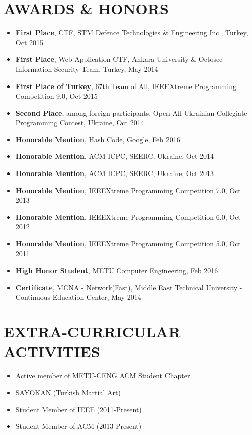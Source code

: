\documentclass[margin, 10pt]{res} %
\begin{document}
\begin{resume}
\newpage










\section{AWARDS \& HONORS}
\begin{itemize} \itemsep -2pt %
\item {\bf First Place}, CTF, STM Defence Technologies \& Engineering Inc., Turkey, Oct 2015
\item {\bf First Place}, Web Application CTF, Ankara University \& Octosec Information Security Team, Turkey, May 2014
\item {\bf First Place of Turkey}, 67th Team of All, IEEEXtreme Programming Competition 9.0, Oct 2015
\item {\bf Second Place}, among foreign participants, Open All-Ukrainian Collegiate Programming Contest, Ukraine, Oct 2014
\item {\bf Honorable Mention}, Hash Code, Google, Feb 2016
\item {\bf Honorable Mention}, ACM ICPC, SEERC, Ukraine, Oct 2014
\item {\bf Honorable Mention}, ACM ICPC, SEERC, Ukraine, Oct 2013
\item {\bf Honorable Mention}, IEEEXtreme Programming Competition 7.0, Oct 2013
\item {\bf Honorable Mention}, IEEEXtreme Programming Competition 6.0, Oct 2012
\item {\bf Honorable Mention}, IEEEXtreme Programming Competition 5.0, Oct 2011
\item {\bf High Honor Student}, METU Computer Engineering, Feb 2016

\item {\bf Certificate}, MCNA - Network(Fast), Middle East Technical University - Continuous Education Center, May 2014
\end{itemize}



\section{EXTRA-CURRICULAR \\ ACTIVITIES}

\begin{itemize} \itemsep -2pt %
\item Active member of METU-CENG ACM Student Chapter
\item SAYOKAN (Turkish Martial Art)
\item Student Member of IEEE (2011-Present)
\item Student Member of ACM (2013-Present)
\end{itemize}







\end{resume}
\end{document}
